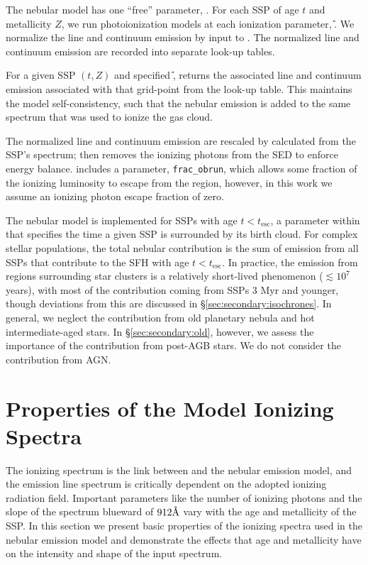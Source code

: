 The nebular model has one ``free'' parameter, \logU{}. For each SSP of age $t$ and metallicity $Z$, we run photoionization models at each ionization parameter, \U{}. We normalize the line and continuum emission by \QH{} input to \Cloudy. The normalized line and continuum emission are recorded into separate look-up tables.

For a given SSP $(t, Z)$ and specified \U{}, \FSPS returns the associated line and continuum emission associated with that grid-point from the look-up table. This maintains the model self-consistency, such that the nebular emission is added to the same spectrum that was used to ionize the gas cloud. 

The normalized line and continuum emission are rescaled by \QH{} calculated from the SSP's spectrum; \FSPS then removes the ionizing photons from the SED to enforce energy balance. \FSPS includes a parameter, {\tt frac\_obrun}, which allows some fraction of the ionizing luminosity to escape from the \hii region, however, in this work we assume an ionizing photon escape fraction of zero.

The nebular model is implemented for SSPs with age $t < t_{\mathrm{esc}}$, a parameter within \FSPS that specifies the time a given SSP is surrounded by its birth cloud. For complex stellar populations, the total nebular contribution is the sum of emission from all SSPs that contribute to the SFH with age $t < t_{\mathrm{esc}}$. In practice, the emission from \hii regions surrounding star clusters is a relatively short-lived phenomenon ($\lesssim 10^7$ years), with most of the contribution coming from SSPs 3 Myr and younger, though deviations from this are discussed in \S\ref{sec:secondary:isochrones}. In general, we neglect the contribution from old planetary nebula and hot intermediate-aged stars. In \S\ref{sec:secondary:old}, however, we assess the importance of the contribution from post-AGB stars. We do not consider the contribution from AGN.

\section{Properties of the Model Ionizing Spectra}\label{sec:spectra}

The ionizing spectrum is the link between \FSPS and the nebular emission model, and the emission line spectrum is critically dependent on the adopted ionizing radiation field. Important parameters like the number of ionizing photons and the slope of the spectrum blueward of $912\mbox{\AA}$ vary with the age and metallicity of the SSP. In this section we present basic properties of the ionizing spectra used in the nebular emission model and demonstrate the effects that age and metallicity have on the intensity and shape of the input spectrum.

